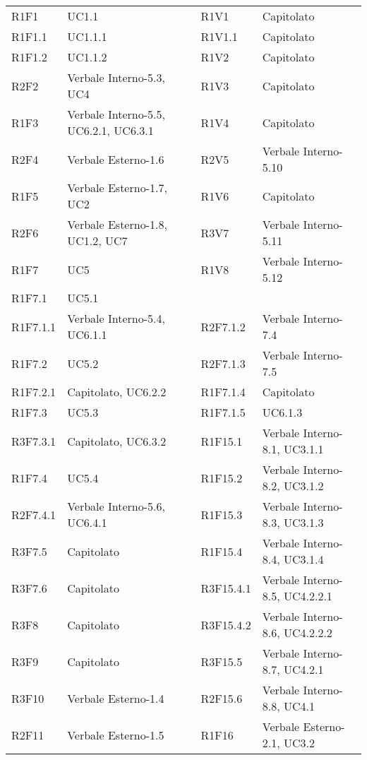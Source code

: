 \begin{center}
\begin{longtable}{C{2cm} | C{5cm} C{0.2cm} C{2cm} | C{5cm}}
R1F1 & UC1.1 &  & R1V1 & Capitolato \\
R1F1.1 & UC1.1.1 &  & R1V1.1 & Capitolato \\
R1F1.2 & UC1.1.2 &  & R1V2 & Capitolato  \\
R2F2 & Verbale Interno-5.3, UC4 &  & R1V3 & Capitolato  \\
R1F3 & Verbale Interno-5.5, UC6.2.1, UC6.3.1 &  & R1V4 & Capitolato\\
R2F4 & Verbale Esterno-1.6 &  & R2V5 & Verbale Interno-5.10  \\
R1F5 & Verbale Esterno-1.7, UC2 &  & R1V6 & Capitolato \\
R2F6 & Verbale Esterno-1.8, UC1.2, UC7 &  & R3V7 & Verbale Interno-5.11  \\
R1F7 & UC5 &  & R1V8 & Verbale Interno-5.12  \\
R1F7.1 & UC5.1 &  & & \\
R1F7.1.1 & Verbale Interno-5.4, UC6.1.1 &  & R2F7.1.2 & Verbale Interno-7.4 \\
R1F7.2 & UC5.2 &  & R2F7.1.3 & Verbale Interno-7.5 \\
R1F7.2.1 & Capitolato, UC6.2.2 &  & R1F7.1.4  & Capitolato \\
R1F7.3 & UC5.3 &  & R1F7.1.5 & UC6.1.3 \\
R3F7.3.1 & Capitolato, UC6.3.2 &  & R1F15.1  & Verbale Interno-8.1, UC3.1.1 \\
R1F7.4 & UC5.4 &  & R1F15.2 & Verbale Interno-8.2, UC3.1.2 \\
R2F7.4.1 & Verbale Interno-5.6, UC6.4.1 &  & R1F15.3 & Verbale Interno-8.3, UC3.1.3 \\
R3F7.5 & Capitolato &  & R1F15.4 & Verbale Interno-8.4, UC3.1.4 \\
R3F7.6 & Capitolato &  & R3F15.4.1 & Verbale Interno-8.5, UC4.2.2.1 \\
R3F8 & Capitolato &  & R3F15.4.2 & Verbale Interno-8.6, UC4.2.2.2 \\
R3F9 & Capitolato &  & R3F15.5 & Verbale Interno-8.7, UC4.2.1 \\
R3F10 & Verbale Esterno-1.4 &  & R2F15.6 & Verbale Interno-8.8, UC4.1 \\
R2F11 & Verbale Esterno-1.5 &  & R1F16 & Verbale Esterno-2.1, UC3.2 \\

\end{longtable}
\end{center}
